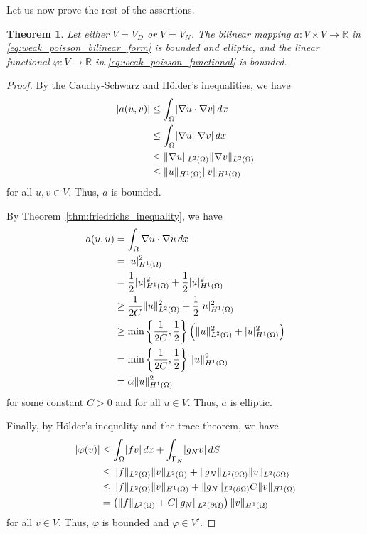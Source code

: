 \documentclass[english, 12pt, a4paper, sci, utf8, a-2b, online]{aaltothesis}
\theoremstyle{definition}
\theoremstyle{plain}
\newtheorem{theorem}{Theorem}[section]
\DeclarePairedDelimiter\abs{\lvert}{\rvert}
\DeclarePairedDelimiter\norm{\lVert}{\rVert}
\newcommand*\diff{\mathop{}\!d}
\numberwithin{equation}{section}
\begin{document}
Let us now prove the rest of the assertions.
\begin{theorem}
    \label{thm:weak_poisson_reqs_2_and_3}
    Let either $V = V_D$ or $V = V_N$.
    The bilinear mapping $a: V \times V \to \mathbb{R}$ in
    \eqref{eq:weak_poisson_bilinear_form} is bounded and elliptic,
    and the linear functional $\varphi: V \to \mathbb{R}$ in
    \eqref{eq:weak_poisson_functional} is bounded.
\end{theorem}
\begin{proof}
    By the Cauchy-Schwarz and Hölder's inequalities, we have
    \begin{align*}
        \abs{a(u,v)}
        &\leq \int_{\Omega} \abs{\nabla u \cdot \nabla v} \diff x \\
        &\leq \int_{\Omega} \abs{\nabla u} \abs{\nabla v} \diff x \\
        &\leq \norm{\nabla u}_{L^2(\Omega)} \norm{\nabla v}_{L^2(\Omega)} \\
        &\leq \norm{u}_{H^1(\Omega)} \norm{v}_{H^1(\Omega)}
    \end{align*}
    for all $u,v \in V$. Thus, $a$ is bounded.

    By Theorem~\ref{thm:friedrichs_inequality}, we have
    \begin{align*}
        a(u,u)
        &= \int_{\Omega} \nabla u \cdot \nabla u \diff x \\
        &= \abs{u}_{H^1(\Omega)}^2 \\
        &= \frac{1}{2} \abs{u}_{H^1(\Omega)}^2
            + \frac{1}{2} \abs{u}_{H^1(\Omega)}^2 \\
        &\geq \frac{1}{2C} \norm{u}_{L^2(\Omega)}^2
            + \frac{1}{2} \abs{u}_{H^1(\Omega)}^2 \\
        &\geq \min\left\{ \frac{1}{2C}, \frac{1}{2} \right\}
            \left( \norm{u}_{L^2(\Omega)}^2 + \abs{u}_{H^1(\Omega)}^2 \right) \\
        &= \min\left\{ \frac{1}{2C}, \frac{1}{2} \right\}
            \norm{u}_{H^1(\Omega)}^2 \\
        &= \alpha \norm{u}_{H^1(\Omega)}^2
    \end{align*}
    for some constant $C > 0$ and for all $u \in V$. Thus, $a$ is elliptic.

     Finally, by Hölder's inequality and the trace theorem, we have
     \begin{align*}
        \abs{\varphi(v)}
        &\leq \int_{\Omega} \abs{fv} \diff x
            + \int_{\Gamma_N} \abs{g_N v} \diff S \\
        &\leq \norm{f}_{L^2(\Omega)} \norm{v}_{L^2(\Omega)}
            + \norm{g_N}_{L^2(\partial \Omega)} \norm{v}_{L^2(\partial \Omega)} \\
        &\leq \norm{f}_{L^2(\Omega)} \norm{v}_{H^1(\Omega)}
            + \norm{g_N}_{L^2(\partial \Omega)} C \norm{v}_{H^1(\Omega)} \\
        &= \left( \norm{f}_{L^2(\Omega)} + C \norm{g_N}_{L^2(\partial \Omega)} 
            \right) \norm{v}_{H^1(\Omega)}
     \end{align*}
     for all $v \in V$. Thus, $\varphi$ is bounded and $\varphi \in V'$.
\end{proof}
\end{document}
